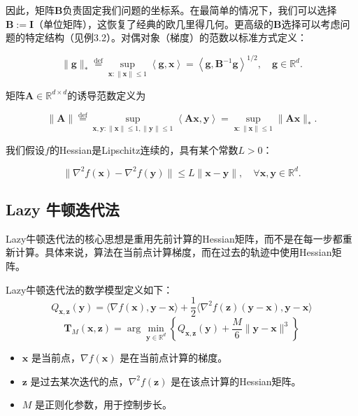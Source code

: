 \documentclass[a4paper,twoside,AutoFakeBold]{article}
\theoremstyle{definition}
\begin{document}
因此，矩阵\(\mathbf{B}\)负责固定我们问题的坐标系。在最简单的情况下，我们可以选择\(\mathbf{B} := \mathbf{I}\)（单位矩阵），这恢复了经典的欧几里得几何。更高级的\(\mathbf{B}\)选择可以考虑问题的特定结构（见例3.2）。对偶对象（梯度）的范数以标准方式定义：

\[
\|\mathbf{g}\|_* \stackrel{\text{def}}{=} \sup_{\mathbf{x} : \|\mathbf{x}\| \leq 1} \left\langle \mathbf{g}, \mathbf{x} \right\rangle = \left\langle \mathbf{g}, \mathbf{B}^{-1} \mathbf{g} \right\rangle^{1/2}, \quad \mathbf{g} \in \mathbb{R}^d.
\]

矩阵\(\mathbf{A} \in \mathbb{R}^{d \times d}\)的诱导范数定义为

\[
\|\mathbf{A}\| \stackrel{\text{def}}{=} \sup_{\mathbf{x}, \mathbf{y} : \|\mathbf{x}\| \leq 1, \|\mathbf{y}\| \leq 1} \left\langle \mathbf{A} \mathbf{x}, \mathbf{y} \right\rangle = \sup_{\mathbf{x} : \|\mathbf{x}\| \leq 1} \|\mathbf{A} \mathbf{x}\|_*.
\]

我们假设\(f\)的Hessian是Lipschitz连续的，具有某个常数\(L > 0\)：

\begin{equation}\label{3}
\|\nabla^2 f(\mathbf{x}) - \nabla^2 f(\mathbf{y})\| \leq L \|\mathbf{x} - \mathbf{y}\|, \quad \forall \mathbf{x}, \mathbf{y} \in \mathbb{R}^d. \tag{3}
\end{equation}
\newpage

\subsection{Lazy 牛顿迭代法}\label{sec:2}
Lazy牛顿迭代法的核心思想是重用先前计算的Hessian矩阵，而不是在每一步都重新计算。具体来说，算法在当前点计算梯度，而在过去的轨迹中使用Hessian矩阵。

Lazy牛顿迭代法的数学模型定义如下：
\[
Q_{\mathbf{x}, \mathbf{z}}(\mathbf{y}) = \langle \nabla f(\mathbf{x}), \mathbf{y} - \mathbf{x} \rangle + \frac{1}{2} \langle \nabla^{2}f(\mathbf{z})(\mathbf{y} - \mathbf{x}), \mathbf{y} - \mathbf{x} \rangle 
\]
\begin{equation}\label{4}
\mathbf{T}_{M}(\mathbf{x},\mathbf{z}) = \arg\min_{\mathbf{y}\in\mathbb{R}^{d}} 
\left\{ Q_{\mathbf{x}, \mathbf{z}}(\mathbf{y}) + \frac{M}{6} \|\mathbf{y} - \mathbf{x}\|^{3} \right\} \tag{4}
\end{equation}

\begin{itemize}
    \item \(\mathbf{x}\) 是当前点，\(\nabla f(\mathbf{x})\) 是在当前点计算的梯度。
    \item \(\mathbf{z}\) 是过去某次迭代的点，\(\nabla^{2}f(\mathbf{z})\) 是在该点计算的Hessian矩阵。
    \item \(M\) 是正则化参数，用于控制步长。
\end{itemize}
\end{document}
